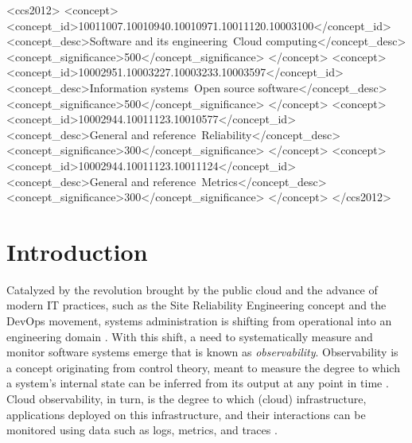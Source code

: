 \documentclass[sigconf]{acmart}
\begin{document}

\begin{CCSXML}
<ccs2012>
   <concept>
       <concept_id>10011007.10010940.10010971.10011120.10003100</concept_id>
       <concept_desc>Software and its engineering~Cloud computing</concept_desc>
       <concept_significance>500</concept_significance>
       </concept>
   <concept>
       <concept_id>10002951.10003227.10003233.10003597</concept_id>
       <concept_desc>Information systems~Open source software</concept_desc>
       <concept_significance>500</concept_significance>
       </concept>
   <concept>
       <concept_id>10002944.10011123.10010577</concept_id>
       <concept_desc>General and reference~Reliability</concept_desc>
       <concept_significance>300</concept_significance>
       </concept>
   <concept>
       <concept_id>10002944.10011123.10011124</concept_id>
       <concept_desc>General and reference~Metrics</concept_desc>
       <concept_significance>300</concept_significance>
       </concept>
 </ccs2012>
\end{CCSXML}


\maketitle

\section{Introduction}\label{introduction}

Catalyzed by the revolution brought by the public cloud and the advance
of modern IT practices, such as the Site Reliability Engineering concept
\cite{beyer2016site} and the DevOps movement, systems administration
is shifting from operational into an engineering domain
\cite{beyer2016site}. With this shift, a need to systematically
measure and monitor software systems emerge that is known as
\emph{observability}. Observability is a concept originating from
control theory, meant to measure the degree to which a system's internal
state can be inferred from its output at any point in time
\cite{niedermaier2019observability}. Cloud observability, in turn,
is the degree to which (cloud) infrastructure, applications deployed on
this infrastructure, and their interactions can be monitored using data
such as logs, metrics, and traces \cite{picoreti2018multilevel}.
\end{document}

